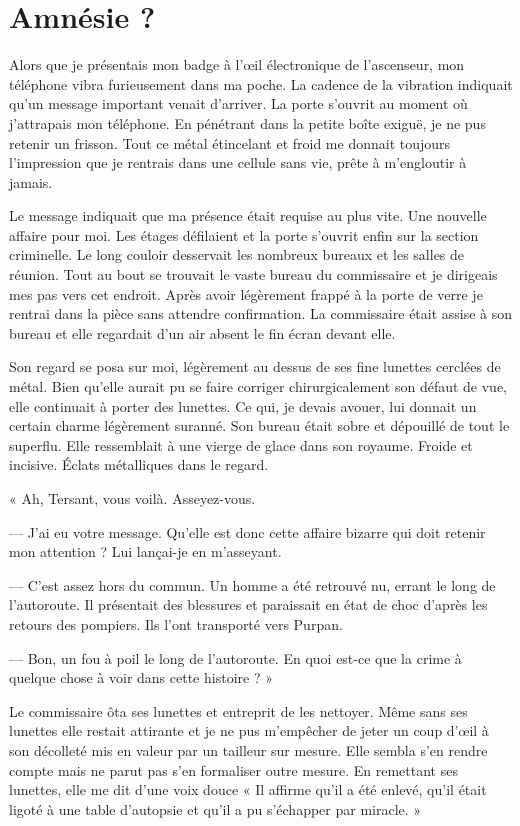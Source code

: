 \chapter{Amnésie ?}

Alors que je présentais mon badge à l'œil électronique de l'ascenseur, mon téléphone vibra furieusement dans ma poche.
La cadence de la vibration indiquait qu'un message important venait d'arriver. La porte s'ouvrit au moment où
j'attrapais mon téléphone. En pénétrant dans la petite boîte exiguë, je ne pus retenir un frisson. Tout ce métal
étincelant et froid me donnait toujours l'impression que je rentrais dans une cellule sans vie, prête à m'engloutir à
jamais. 

Le message indiquait que ma présence était requise au plus vite. Une nouvelle affaire pour moi. Les étages défilaient 
et la porte s'ouvrit enfin sur la section criminelle. Le long couloir desservait les nombreux bureaux et les salles de 
réunion. Tout au bout se trouvait le vaste bureau du commissaire et je dirigeais mes pas vers cet endroit. Après avoir 
légèrement frappé à la porte de verre je rentrai dans la pièce sans attendre confirmation. La commissaire était assise à 
son bureau et elle regardait d'un air absent le fin écran devant elle.

Son regard se posa sur moi, légèrement au dessus de ses fine lunettes cerclées de métal. Bien qu'elle aurait pu se faire
corriger chirurgicalement son défaut de vue, elle continuait à porter des lunettes. Ce qui, je devais avouer, lui 
donnait un certain charme légèrement suranné. Son bureau était sobre et dépouillé de tout le superflu. Elle ressemblait 
à une vierge de glace dans son royaume. Froide et incisive. Éclats métalliques dans le regard.

« Ah, Tersant, vous voilà. Asseyez-vous.

— J'ai eu votre message. Qu'elle est donc cette affaire bizarre qui doit retenir mon attention ? Lui lançai-je en
m'asseyant.

— C'est assez hors du commun. Un homme a été retrouvé nu, errant le long de l'autoroute. Il présentait des blessures et
paraissait en état de choc d'après les retours des pompiers. Ils l'ont transporté vers Purpan.

— Bon, un fou à poil le long de l'autoroute. En quoi est-ce que la crime à quelque chose à voir dans cette histoire ? »

Le commissaire ôta ses lunettes et entreprit de les nettoyer. Même sans ses lunettes elle restait attirante et je ne pus
m'empêcher de jeter un coup d'œil à son décolleté mis en valeur par un tailleur sur mesure. Elle sembla s'en rendre
compte mais ne parut pas s'en formaliser outre mesure. En remettant ses lunettes, elle me dit d'une voix douce « Il
affirme qu'il a été enlevé, qu'il était ligoté à une table d'autopsie et qu'il a pu s'échapper par miracle. »

